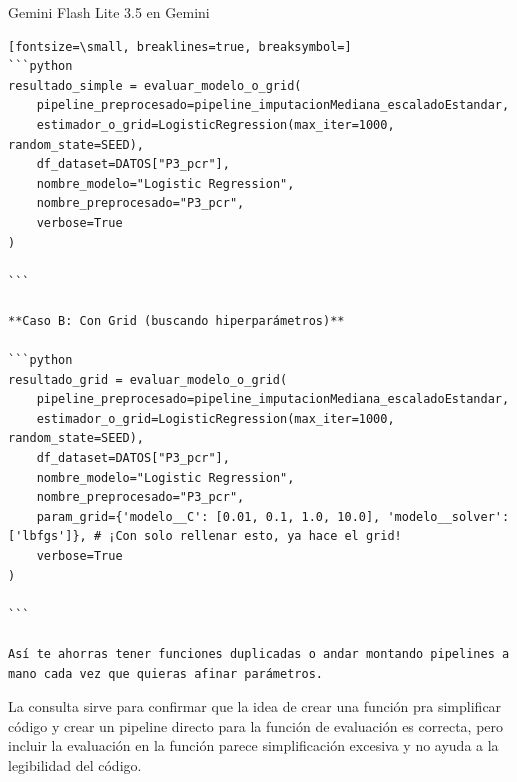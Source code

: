 \documentclass[12pt,a4paper,oneside]{book}
\begin{document}
\begin{iaresp}{Gemini Flash Lite 3.5 en Gemini}
\begin{Verbatim}[fontsize=\small, breaklines=true, breaksymbol=]
```python
resultado_simple = evaluar_modelo_o_grid(
    pipeline_preprocesado=pipeline_imputacionMediana_escaladoEstandar,
    estimador_o_grid=LogisticRegression(max_iter=1000, random_state=SEED),
    df_dataset=DATOS["P3_pcr"],
    nombre_modelo="Logistic Regression",
    nombre_preprocesado="P3_pcr",
    verbose=True
)

```

**Caso B: Con Grid (buscando hiperparámetros)**

```python
resultado_grid = evaluar_modelo_o_grid(
    pipeline_preprocesado=pipeline_imputacionMediana_escaladoEstandar,
    estimador_o_grid=LogisticRegression(max_iter=1000, random_state=SEED),
    df_dataset=DATOS["P3_pcr"],
    nombre_modelo="Logistic Regression",
    nombre_preprocesado="P3_pcr",
    param_grid={'modelo__C': [0.01, 0.1, 1.0, 10.0], 'modelo__solver': ['lbfgs']}, # ¡Con solo rellenar esto, ya hace el grid!
    verbose=True
)

```

Así te ahorras tener funciones duplicadas o andar montando pipelines a mano cada vez que quieras afinar parámetros.
\end{Verbatim}
\end{iaresp}
\begin{iaanalisis}
La consulta sirve para confirmar que la idea de crear una función pra simplificar código y crear un pipeline directo para la función de evaluación es correcta, pero incluir la evaluación en la función parece simplificación excesiva y no ayuda a la legibilidad del código.
\end{iaanalisis}
\end{document}
